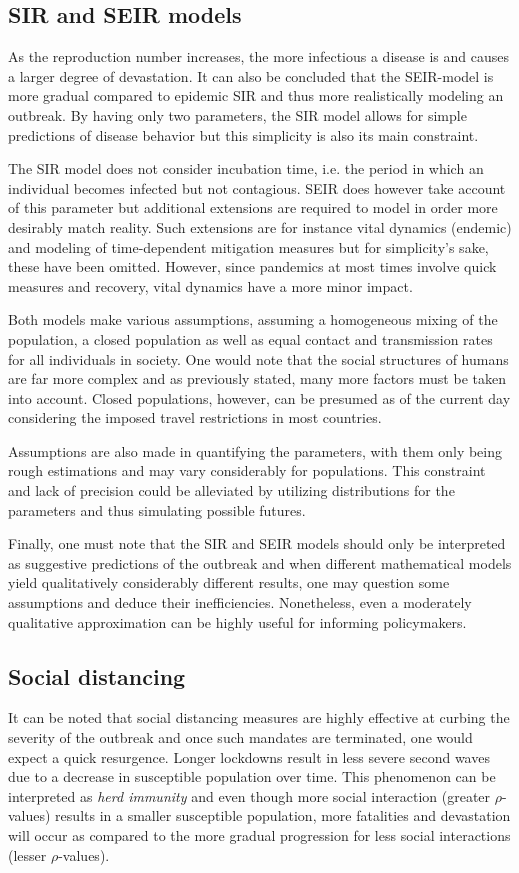 \documentclass[12pt]{article}
\begin{document}
\subsection{SIR and SEIR models}
As the reproduction number increases, the more infectious a disease is and causes a larger degree of devastation. It can also be concluded that the SEIR-model is more gradual compared to epidemic SIR and thus more realistically modeling an outbreak. By having only two parameters, the SIR model allows for simple predictions of disease behavior but this simplicity is also its main constraint. 

The SIR model does not consider incubation time, i.e. the period in which an individual becomes infected but not contagious. SEIR does however take account of this parameter but additional extensions are required to model in order more desirably match reality. Such extensions are for instance vital dynamics (endemic) and modeling of time-dependent mitigation measures but for simplicity's sake, these have been omitted. However, since pandemics at most times involve quick measures and recovery, vital dynamics have a more minor impact. 

Both models make various assumptions, assuming a homogeneous mixing of the population, a closed population as well as equal contact and transmission rates for all individuals in society. One would note that the social structures of humans are far more complex and as previously stated, many more factors must be taken into account. Closed populations, however, can be presumed as of the current day considering the imposed travel restrictions in most countries. 

Assumptions are also made in quantifying the parameters, with them only being rough estimations and may vary considerably for populations. This constraint and lack of precision could be alleviated by utilizing distributions for the parameters and thus simulating possible futures.

Finally, one must note that the SIR and SEIR models should only be interpreted as suggestive predictions of the outbreak and when different mathematical models yield qualitatively considerably different results, one may question some assumptions and deduce their inefficiencies. Nonetheless, even a moderately qualitative approximation can be highly useful for informing policymakers.


\newpage 

\subsection{Social distancing}
It can be noted that social distancing measures are highly effective at curbing the severity of the outbreak and once such mandates are terminated, one would expect a quick resurgence. Longer lockdowns result in less severe second waves due to a decrease in susceptible population over time. This phenomenon can be interpreted as \textit{herd immunity} and even though more social interaction (greater $\rho$-values) results in a smaller susceptible population, more fatalities and devastation will occur as compared to the more gradual progression for less social interactions (lesser $\rho$-values).
\end{document}
